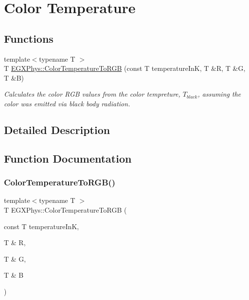 \hypertarget{group___e_g_x_phys-_astrophysics-_color_temperature}{}\section{Color Temperature}
\label{group___e_g_x_phys-_astrophysics-_color_temperature}
\subsection*{Functions}
\begin{DoxyCompactItemize}
\item 
{\footnotesize template$<$typename T $>$ }\\T \mbox{\hyperlink{group___e_g_x_phys-_astrophysics-_color_temperature_ga81db6b5b397c9f788001be73adae032d}{E\+G\+X\+Phys\+::\+Color\+Temperature\+To\+R\+GB}} (const T temperature\+InK, T \&R, T \&G, T \&B)
\begin{DoxyCompactList}\small\item\em Calculates the color R\+GB values from the color tempreture, $T_{black}$, assuming the color was emitted via black body radiation. \end{DoxyCompactList}\end{DoxyCompactItemize}


\subsection{Detailed Description}


\subsection{Function Documentation}
\mbox{\label{group___e_g_x_phys-_astrophysics-_color_temperature_ga81db6b5b397c9f788001be73adae032d}} 
\subsubsection{\texorpdfstring{Color\+Temperature\+To\+R\+G\+B()}{ColorTemperatureToRGB()}}
{\footnotesize\ttfamily template$<$typename T $>$ \\
T E\+G\+X\+Phys\+::\+Color\+Temperature\+To\+R\+GB (\begin{DoxyParamCaption}\item[{const T}]{temperature\+InK,  }\item[{T \&}]{R,  }\item[{T \&}]{G,  }\item[{T \&}]{B }\end{DoxyParamCaption})}



